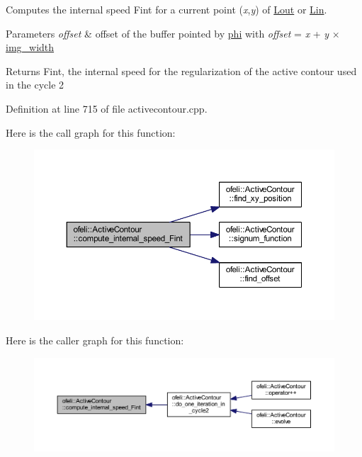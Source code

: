 Computes the internal speed Fint for a current point ({\itshape x},{\itshape y}) of \hyperlink{classofeli_1_1_active_contour_a31e0eb18a7ea6ae90acf66ed018fcd85}{Lout} or \hyperlink{classofeli_1_1_active_contour_a7662d4f5c8b87d3e642b08b7e341bd79}{Lin}. 


\begin{DoxyParams}{Parameters}
{\em offset} & offset of the buffer pointed by \hyperlink{classofeli_1_1_active_contour_aacb03a6ded4ca51cb52f58aeff955ef7}{phi} with {\itshape offset} = {\itshape x} + {\itshape y} × \hyperlink{classofeli_1_1_active_contour_a3623de7ebc0d27ba7fac21a5929afbc6}{img\-\_\-width} \\
\hline
\end{DoxyParams}
\begin{DoxyReturn}{Returns}
Fint, the internal speed for the regularization of the active contour used in the cycle 2 
\end{DoxyReturn}


Definition at line 715 of file activecontour.\-cpp.



Here is the call graph for this function\-:\nopagebreak
\begin{figure}[H]
\begin{center}
\leavevmode
\includegraphics[width=350pt]{classofeli_1_1_active_contour_ad920bced735a1a78b0bf32e9f452dccb_cgraph}
\end{center}
\end{figure}




Here is the caller graph for this function\-:\nopagebreak
\begin{figure}[H]
\begin{center}
\leavevmode
\includegraphics[width=350pt]{classofeli_1_1_active_contour_ad920bced735a1a78b0bf32e9f452dccb_icgraph}
\end{center}
\end{figure}


